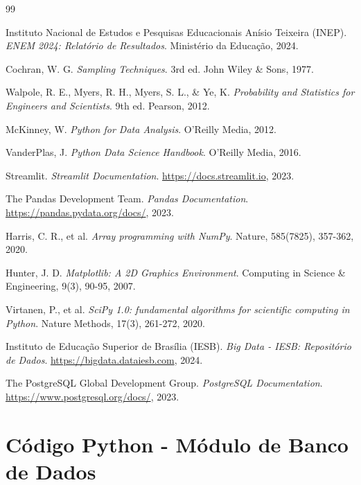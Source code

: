 \documentclass[12pt,a4paper]{article}
\begin{document}
\begin{thebibliography}{99}

Instituto Nacional de Estudos e Pesquisas Educacionais Anísio Teixeira (INEP). 
\textit{ENEM 2024: Relatório de Resultados}. 
Ministério da Educação, 2024.

Cochran, W. G. 
\textit{Sampling Techniques}. 
3rd ed. John Wiley \& Sons, 1977.

Walpole, R. E., Myers, R. H., Myers, S. L., \& Ye, K. 
\textit{Probability and Statistics for Engineers and Scientists}. 
9th ed. Pearson, 2012.

McKinney, W. 
\textit{Python for Data Analysis}. 
O'Reilly Media, 2012.

VanderPlas, J. 
\textit{Python Data Science Handbook}. 
O'Reilly Media, 2016.

Streamlit. 
\textit{Streamlit Documentation}. 
\url{https://docs.streamlit.io}, 2023.

The Pandas Development Team. 
\textit{Pandas Documentation}. 
\url{https://pandas.pydata.org/docs/}, 2023.

Harris, C. R., et al. 
\textit{Array programming with NumPy}. 
Nature, 585(7825), 357-362, 2020.

Hunter, J. D. 
\textit{Matplotlib: A 2D Graphics Environment}. 
Computing in Science \& Engineering, 9(3), 90-95, 2007.

Virtanen, P., et al. 
\textit{SciPy 1.0: fundamental algorithms for scientific computing in Python}. 
Nature Methods, 17(3), 261-272, 2020.

Instituto de Educação Superior de Brasília (IESB). 
\textit{Big Data - IESB: Repositório de Dados}. 
\url{https://bigdata.dataiesb.com}, 2024.

The PostgreSQL Global Development Group. 
\textit{PostgreSQL Documentation}. 
\url{https://www.postgresql.org/docs/}, 2023.

\end{thebibliography}

\newpage

\appendix

\section{Código Python - Módulo de Banco de Dados}
\end{document}
